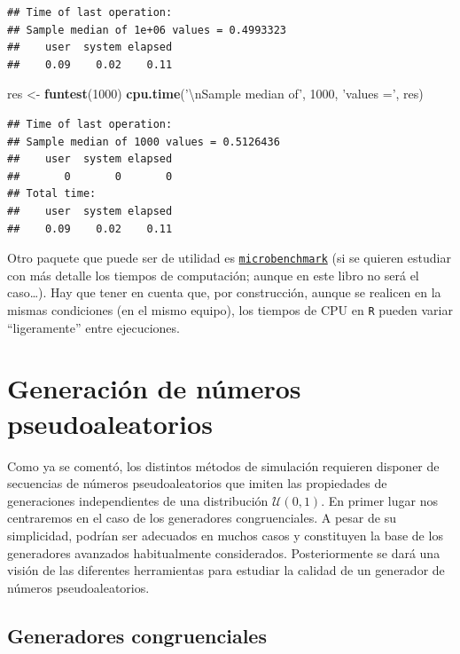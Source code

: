 \documentclass[
]{book}
\newenvironment{Shaded}{\begin{snugshade}}{\end{snugshade}}
\newcommand{\CharTok}[1]{\textcolor[rgb]{0.31,0.60,0.02}{#1}}
\newcommand{\DecValTok}[1]{\textcolor[rgb]{0.00,0.00,0.81}{#1}}
\newcommand{\KeywordTok}[1]{\textcolor[rgb]{0.13,0.29,0.53}{\textbf{#1}}}
\newcommand{\NormalTok}[1]{#1}
\newcommand{\StringTok}[1]{\textcolor[rgb]{0.31,0.60,0.02}{#1}}
\theoremstyle{break}
\theoremstyle{definition}
\theoremstyle{definition}
\theoremstyle{definition}
\theoremstyle{remark}
\begin{document}
\begin{verbatim}
## Time of last operation: 
## Sample median of 1e+06 values = 0.4993323 
##    user  system elapsed 
##    0.09    0.02    0.11
\end{verbatim}

\begin{Shaded}
\begin{Highlighting}[]
\NormalTok{res <-}\StringTok{ }\KeywordTok{funtest}\NormalTok{(}\DecValTok{1000}\NormalTok{)}
\KeywordTok{cpu.time}\NormalTok{(}\StringTok{'}\CharTok{\textbackslash{}n}\StringTok{Sample median of'}\NormalTok{, }\DecValTok{1000}\NormalTok{, }\StringTok{'values ='}\NormalTok{, res)}
\end{Highlighting}
\end{Shaded}

\begin{verbatim}
## Time of last operation: 
## Sample median of 1000 values = 0.5126436 
##    user  system elapsed 
##       0       0       0 
## Total time:
##    user  system elapsed 
##    0.09    0.02    0.11
\end{verbatim}

Otro paquete que puede ser de utilidad es
\href{https://CRAN.R-project.org/package=microbenchmark}{\texttt{microbenchmark}}
(si se quieren estudiar con más detalle los tiempos de computación;
aunque en este libro no será el caso\ldots).
Hay que tener en cuenta que, por construcción, aunque se realicen en la mismas
condiciones (en el mismo equipo), los tiempos de CPU en \texttt{R} pueden variar
``ligeramente'' entre ejecuciones.

\hypertarget{cap3}{%
\chapter{Generación de números pseudoaleatorios}\label{cap3}}

Como ya se comentó, los distintos métodos de simulación requieren disponer de secuencias de números pseudoaleatorios que imiten las propiedades de generaciones independientes de una distribución \(\mathcal{U}(0,1)\).
En primer lugar nos centraremos en el caso de los generadores congruenciales. A pesar de su simplicidad, podrían ser adecuados en muchos casos y constituyen la base de los generadores avanzados habitualmente considerados.
Posteriormente se dará una visión de las diferentes herramientas para estudiar la calidad de un generador de números pseudoaleatorios.

\hypertarget{gen-cong}{%
\section{Generadores congruenciales}\label{gen-cong}}
\end{document}
